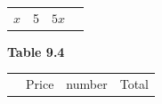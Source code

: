 {\begin{mdframed}[linewidth=4, leftmargin=40, rightmargin=40]
\begin{exercise}
\begin{enumerate}[noitemsep, label=\textbf{Step} \textbf{\arabic*}. ]
{{\begin{center}
\begin{tabular}[t]{|l|l|l|l|}
                  $x$
                 &
        5 &
                  $5x$
     \tabularnewline\cline{1-1}\cline{2-2}\cline{3-3}\cline{4-4}
    \end{tabular}
      \end{center}
    \begin{center}{\small\bfseries Table 9.4}\end{center}
          }{ %
        \begin{center}
      \label{m39262*id162061}
    \noindent
      \tablelasttail{}
      \begin{xtabular}[t]{|l|l|l|l|}\hline
         &
        Price &
        number &
        Total%
     \tabularnewline{}

\end{xtabular}
\end{center}}}
\end{enumerate}
\end{exercise}
\end{mdframed}}
